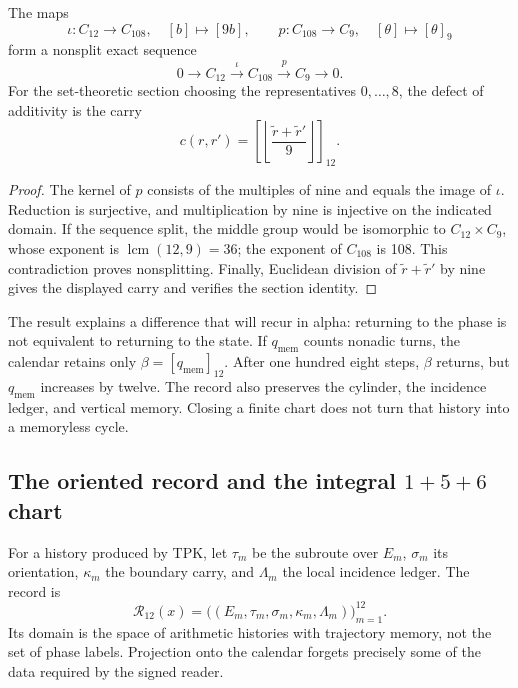 \begin{proposition}
\label{prop:k-extension}
The maps
\[
 \iota:C_{12}\longrightarrow C_{108},\quad[b]\longmapsto[9b],
 \qquad p:C_{108}\longrightarrow C_9,\quad[\theta]\longmapsto[\theta]_9
\]
form a nonsplit exact sequence
\[
 0\longrightarrow C_{12}\xrightarrow{\iota}C_{108}
 \xrightarrow{p}C_9\longrightarrow0.
\]
For the set-theoretic section choosing the representatives
\(0,\ldots,8\), the defect of additivity is the carry
\[
 c(r,r')=\left[\left\lfloor\frac{\widetilde r+\widetilde r'}9\right\rfloor\right]_{12}.
\]
\end{proposition}

\begin{proof}
The kernel of \(p\) consists of the multiples of nine and equals
the image of \(\iota\). Reduction is surjective, and multiplication
by nine is injective on the indicated domain. If the sequence
split, the middle group would be isomorphic to \(C_{12}\times C_9\), whose
exponent is \(\operatorname{lcm}(12,9)=36\); the exponent of
\(C_{108}\) is 108. This contradiction proves nonsplitting. Finally,
Euclidean division of \(\widetilde r+\widetilde r'\) by nine gives the
displayed carry and verifies the section identity.
\end{proof}

The result explains a difference that will recur in alpha: returning to the
phase is not equivalent to returning to the state. If \(q_{\mathrm{mem}}\) counts
nonadic turns, the calendar retains only
\(\beta=[q_{\mathrm{mem}}]_{12}\). After one hundred eight steps,
\(\beta\) returns, but \(q_{\mathrm{mem}}\) increases by twelve. The
record also preserves the cylinder, the incidence ledger, and vertical
memory. Closing a finite chart does not turn that history into a
memoryless cycle.

\subsection{The oriented record and the integral \texorpdfstring{\(1+5+6\)}{1+5+6} chart}
\label{subsec:k-registro-integral}

For a history produced by TPK, let \(\tau_m\) be the subroute over
\(E_m\), \(\sigma_m\) its orientation, \(\kappa_m\) the boundary
carry, and \(\Lambda_m\) the local incidence ledger. The record is
\[
 \mathcal R_{12}(x)=
 \bigl((E_m,\tau_m,\sigma_m,\kappa_m,\Lambda_m)\bigr)_{m=1}^{12}.
\]
Its domain is the space of arithmetic histories with trajectory memory, not the set of
phase labels. Projection onto the calendar forgets precisely some
of the data required by the signed reader.

